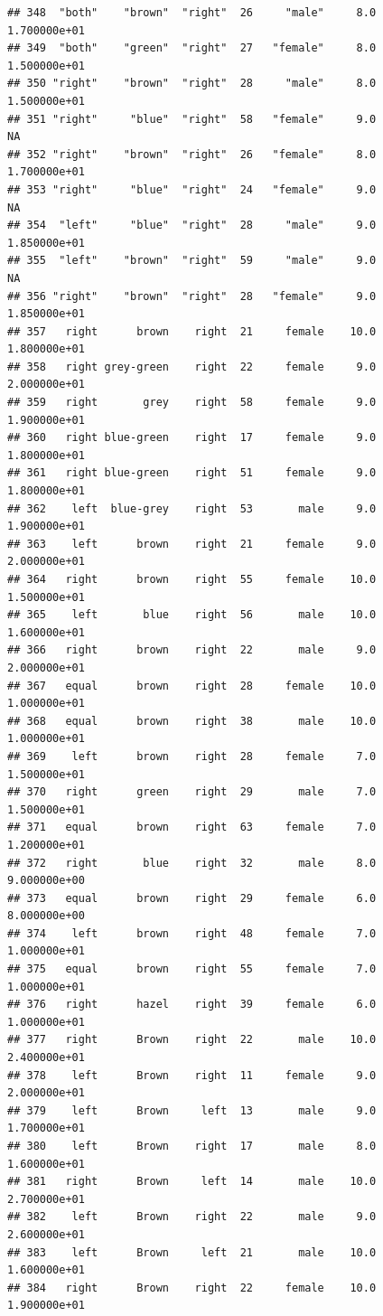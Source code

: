 \documentclass[]{article}
\begin{document}
\begin{verbatim}
## 348  "both"    "brown"  "right"  26     "male"     8.0  1.700000e+01
## 349  "both"    "green"  "right"  27   "female"     8.0  1.500000e+01
## 350 "right"    "brown"  "right"  28     "male"     8.0  1.500000e+01
## 351 "right"     "blue"  "right"  58   "female"     9.0            NA
## 352 "right"    "brown"  "right"  26   "female"     8.0  1.700000e+01
## 353 "right"     "blue"  "right"  24   "female"     9.0            NA
## 354  "left"     "blue"  "right"  28     "male"     9.0  1.850000e+01
## 355  "left"    "brown"  "right"  59     "male"     9.0            NA
## 356 "right"    "brown"  "right"  28   "female"     9.0  1.850000e+01
## 357   right      brown    right  21     female    10.0  1.800000e+01
## 358   right grey-green    right  22     female     9.0  2.000000e+01
## 359   right       grey    right  58     female     9.0  1.900000e+01
## 360   right blue-green    right  17     female     9.0  1.800000e+01
## 361   right blue-green    right  51     female     9.0  1.800000e+01
## 362    left  blue-grey    right  53       male     9.0  1.900000e+01
## 363    left      brown    right  21     female     9.0  2.000000e+01
## 364   right      brown    right  55     female    10.0  1.500000e+01
## 365    left       blue    right  56       male    10.0  1.600000e+01
## 366   right      brown    right  22       male     9.0  2.000000e+01
## 367   equal      brown    right  28     female    10.0  1.000000e+01
## 368   equal      brown    right  38       male    10.0  1.000000e+01
## 369    left      brown    right  28     female     7.0  1.500000e+01
## 370   right      green    right  29       male     7.0  1.500000e+01
## 371   equal      brown    right  63     female     7.0  1.200000e+01
## 372   right       blue    right  32       male     8.0  9.000000e+00
## 373   equal      brown    right  29     female     6.0  8.000000e+00
## 374    left      brown    right  48     female     7.0  1.000000e+01
## 375   equal      brown    right  55     female     7.0  1.000000e+01
## 376   right      hazel    right  39     female     6.0  1.000000e+01
## 377   right      Brown    right  22       male    10.0  2.400000e+01
## 378    left      Brown    right  11     female     9.0  2.000000e+01
## 379    left      Brown     left  13       male     9.0  1.700000e+01
## 380    left      Brown    right  17       male     8.0  1.600000e+01
## 381   right      Brown     left  14       male    10.0  2.700000e+01
## 382    left      Brown    right  22       male     9.0  2.600000e+01
## 383    left      Brown     left  21       male    10.0  1.600000e+01
## 384   right      Brown    right  22     female    10.0  1.900000e+01

\end{verbatim}
\end{document}
